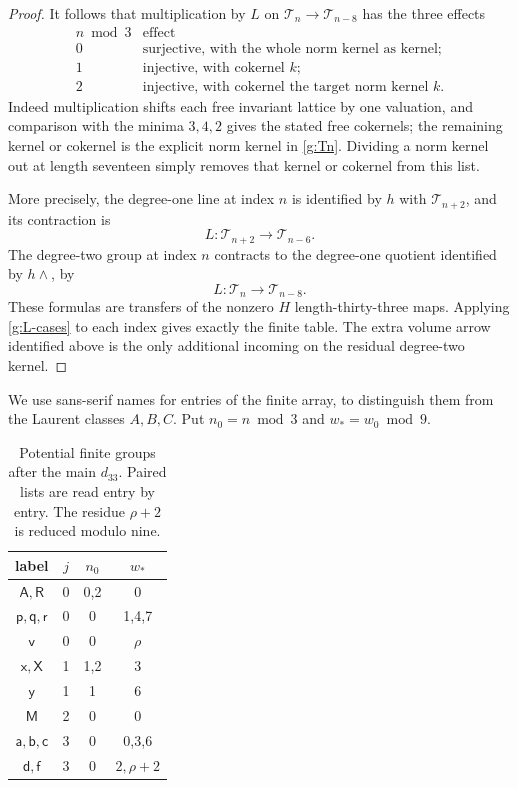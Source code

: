 \begin{proof}
It follows that multiplication by $L$ on
$\mathcal T_n\to\mathcal T_{n-8}$ has the three
effects
\begin{equation}\label{g:L-cases}
\begin{array}{c|l}
 n\bmod3&\text{effect}\\\hline
 0&\text{surjective, with the whole norm kernel as kernel;}\\
 1&\text{injective, with cokernel }k;\\
 2&\text{injective, with cokernel the target norm kernel }k.
\end{array}
\end{equation}
Indeed multiplication shifts each free invariant lattice
by one valuation, and comparison with the minima
$3,4,2$ gives the stated free cokernels; the remaining
kernel or cokernel is the explicit norm kernel in
\eqref{g:Tn}.  Dividing a norm kernel out at length
seventeen simply removes that kernel or cokernel from
this list.

More precisely, the degree-one line at index $n$ is
identified by $h$ with $\mathcal T_{n+2}$, and its
contraction is
\[
 L:\mathcal T_{n+2}\longrightarrow\mathcal T_{n-6}.
\]
The degree-two group at index $n$ contracts to the
degree-one quotient identified by $h\wedge$, by
\[
 L:\mathcal T_n\longrightarrow\mathcal T_{n-8}.
\]
These formulas are transfers of the nonzero $H$
length-thirty-three maps.  Applying
\eqref{g:L-cases} to each index gives exactly the
finite table.  The extra volume arrow identified above
is the only additional incoming on the residual
degree-two kernel.
\end{proof}

We use sans-serif names for entries of the finite array, to
distinguish them from the Laurent classes $A,B,C$.  Put
$n_0=n\bmod3$ and $w_*=w_0\bmod9$.
\begin{table}[htbp]
\centering
\begin{tabular}{c|c|c|c}
\toprule
label&$j$&$n_0$&$w_*$\\\midrule
$\mathsf A,\mathsf R$&0&0,2&0\\
$\mathsf p,\mathsf q,\mathsf r$&0&0&1,4,7\\
$\mathsf v$&0&0&$\rho$\\
$\mathsf x,\mathsf X$&1&1,2&3\\
$\mathsf y$&1&1&6\\
$\mathsf M$&2&0&0\\
$\mathsf a,\mathsf b,\mathsf c$&3&0&0,3,6\\
$\mathsf d,\mathsf f$&3&0&$2,\rho+2$\\\bottomrule
\end{tabular}
\caption{Potential finite groups after the main $d_{33}$.
Paired lists are read entry by entry.  The residue $\rho+2$
is reduced modulo nine.}\label{g:finite-table}
\end{table}

